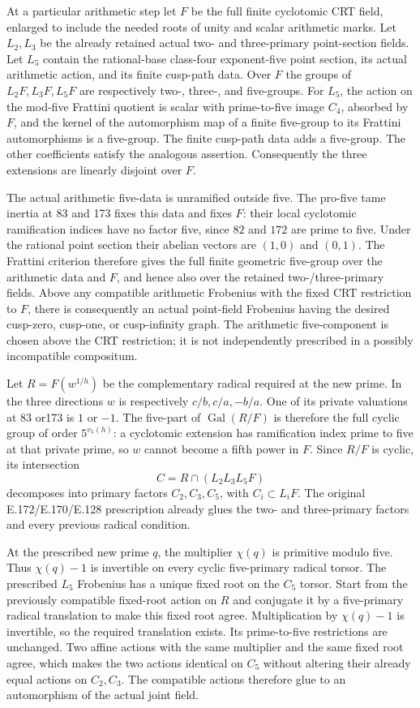 At a particular arithmetic step let $F$ be the full finite cyclotomic
CRT field, enlarged to include the needed roots of unity and scalar
arithmetic marks. Let $L_2,L_3$ be the already retained actual two- and
three-primary point-section fields. Let $L_5$ contain the rational-base
class-four exponent-five point section, its actual arithmetic action,
and its finite cusp-path data. Over $F$ the groups of $L_2F,L_3F,L_5F$
are respectively two-, three-, and five-groups. For $L_5$, the action
on the mod-five Frattini quotient is scalar with prime-to-five image
$C_4$, absorbed by $F$, and the kernel of the automorphism map of a
finite five-group to its Frattini automorphisms is a five-group.
The finite cusp-path data adds a five-group. The other coefficients
satisfy the analogous assertion. Consequently the three extensions are
linearly disjoint over $F$.

The actual arithmetic five-data is unramified outside five. The pro-five
tame inertia at 83 and 173 fixes this data and fixes $F$: their local
cyclotomic ramification indices have no factor five, since $82$ and
$172$ are prime to five. Under the rational point section their
abelian vectors are $(1,0)$ and $(0,1)$. The Frattini criterion therefore
gives the full finite geometric five-group over the arithmetic data
and $F$, and hence also over the retained two-/three-primary fields.
Above any compatible arithmetic Frobenius with the fixed CRT restriction
to $F$, there is consequently an actual point-field Frobenius having the
desired cusp-zero, cusp-one, or cusp-infinity graph. The arithmetic
five-component is chosen above the CRT restriction; it is not independently
prescribed in a possibly incompatible compositum.

Let $R=F(w^{1/h})$ be the complementary radical required at the new
prime. In the three directions $w$ is respectively $c/b,c/a,-b/a$.
One of its private valuations at 83 or173 is $1$ or $-1$. The five-part
of $\operatorname{Gal}(R/F)$ is therefore the full cyclic group of order
$5^{v_5(h)}$: a cyclotomic extension has ramification index prime to five
at that private prime, so $w$ cannot become a fifth power in $F$.
Since $R/F$ is cyclic, its intersection
\[
                  C=R\cap(L_2L_3L_5F)
\]
decomposes into primary factors $C_2,C_3,C_5$, with $C_i\subset L_iF$.
The original E.172/E.170/E.128 prescription already glues the two- and
three-primary factors and every previous radical condition.

At the prescribed new prime $q$, the multiplier $\chi(q)$ is primitive
modulo five. Thus $\chi(q)-1$ is invertible on every cyclic five-primary
radical torsor. The prescribed $L_5$ Frobenius has a unique fixed root on
the $C_5$ torsor. Start from the previously compatible fixed-root action
on $R$ and conjugate it by a five-primary radical translation to make
this fixed root agree. Multiplication by $\chi(q)-1$ is invertible,
so the required translation exists. Its prime-to-five restrictions are
unchanged. Two affine actions with the same multiplier and the same fixed
root agree, which makes the two actions identical on $C_5$ without
altering their already equal actions on $C_2,C_3$. The compatible actions
therefore glue to an automorphism of the actual joint field.

